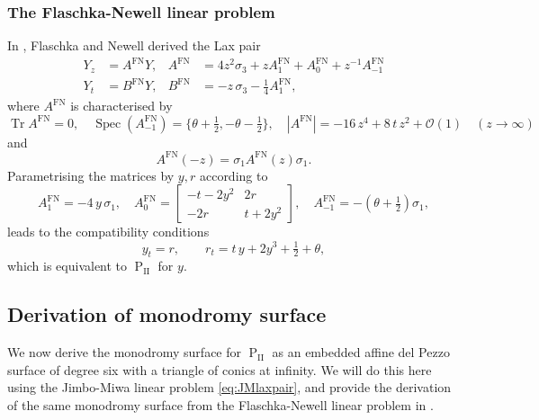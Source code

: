 \documentclass[a4paper,reqno]{amsart}
\numberwithin{equation}{section}
\newcommand{\pain}[1]{\operatorname{P}_{\mathrm{#1}}}
\numberwithin{equation}{section}
\begin{document}
\subsubsection{The Flaschka-Newell linear problem}
In \cite{flaschkanewell}, Flaschka and Newell derived the Lax pair
\begin{subequations} \label{eq:FNlaxpair}
    \begin{align}
    Y_z&=A^{\text{FN}}Y, & A^{\text{FN}}&=4z^2\sigma_3+zA_1^{\text{FN}}+A_0^{\text{FN}}+z^{-1}A_{-1}^{\text{FN}} \label{eq:FNlaxA}\\
    Y_t&=B^{\text{FN}}Y, & B^{\text{FN}}&=-z\,\sigma_3-\tfrac{1}{4}A_1^{\text{FN}},
\end{align}
\end{subequations}
where $A^{\operatorname{FN}}$ is characterised by
\begin{equation*}
    \operatorname{Tr}A^{\text{FN}}=0,\quad \operatorname{Spec}(A_{-1}^{\operatorname{FN}}) = \{\theta+\tfrac{1}{2}, -\theta-\tfrac{1}{2}\},\quad |A^{\text{FN}}|=-16\,z^4+8\,t\,z^2+\mathcal{O}(1)\quad (z\rightarrow \infty)
\end{equation*}
and 
\begin{equation}\label{eq:Asymmetry}
    A^{\text{FN}}(-z)=\sigma_1 A^{\text{FN}}(z)\sigma_1.
\end{equation}
Parametrising the matrices by $y,r$ according to
\begin{equation*}
A_1^{\text{FN}}=-4\,y\, \sigma_1,\quad
A_0^{\text{FN}}=\begin{bmatrix}
    -t-2y^2 & 2r\\
    -2 r & t+2y^2
\end{bmatrix},\quad A_{-1}^{\text{FN}}=-(\theta+\tfrac{1}{2})\sigma_1,
\end{equation*}
leads to the compatibility conditions
\begin{equation*}
    y_t=r,\qquad r_t=t\,y+2y^3+\tfrac{1}{2}+\theta,
\end{equation*}
which is equivalent to $\pain{II}$ for $y$.








\subsection{Derivation of monodromy surface} \label{subsec:spaceofmonodromydataPII}

We now derive the monodromy surface for $\pain{II}$ as an embedded affine del Pezzo surface of degree six with a triangle of conics at infinity.
We will do this here using the Jimbo-Miwa linear problem \eqref{eq:JMlaxpair}, and provide the derivation of the same monodromy surface from the Flaschka-Newell linear problem in .
\end{document}
